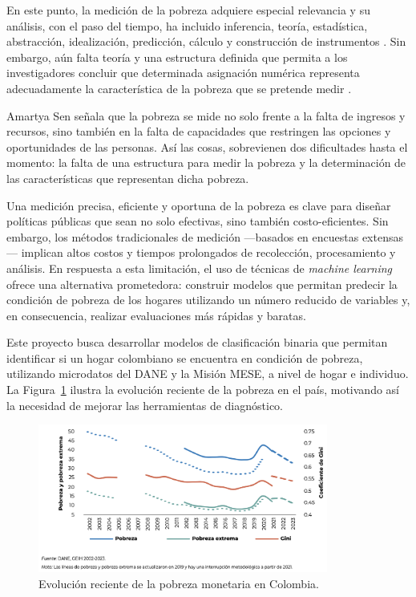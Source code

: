 \documentclass[12pt,a4paper,onecolumn]{article}
\begin{document}
En este punto, la medición de la pobreza adquiere especial relevancia y su análisis, con el paso del tiempo, ha incluido inferencia, teoría, estadística, abstracción, idealización, predicción, cálculo y construcción de instrumentos \cite{tal2016measuring}. Sin embargo, aún falta teoría y una estructura definida que permita a los investigadores concluir que determinada asignación numérica representa adecuadamente la característica de la pobreza que se pretende medir \cite{huffman2024measurement}.

Amartya Sen señala que la pobreza se mide no solo frente a la falta de ingresos y recursos, sino también en la falta de capacidades que restringen las opciones y oportunidades de las personas. Así las cosas, sobrevienen dos dificultades hasta el momento: la falta de una estructura para medir la pobreza y la determinación de las características que representan dicha pobreza.

Una medición precisa, eficiente y oportuna de la pobreza es clave para diseñar políticas públicas que sean no solo efectivas, sino también costo-eficientes. Sin embargo, los métodos tradicionales de medición —basados en encuestas extensas— implican altos costos y tiempos prolongados de recolección, procesamiento y análisis. En respuesta a esta limitación, el uso de técnicas de \textit{machine learning} ofrece una alternativa prometedora: construir modelos que permitan predecir la condición de pobreza de los hogares utilizando un número reducido de variables y, en consecuencia, realizar evaluaciones más rápidas y baratas.

Este proyecto busca desarrollar modelos de clasificación binaria que permitan identificar si un hogar colombiano se encuentra en condición de pobreza, utilizando microdatos del DANE y la Misión MESE, a nivel de hogar e individuo. La Figura~\ref{fig:pobreza_colombia} ilustra la evolución reciente de la pobreza en el país, motivando así la necesidad de mejorar las herramientas de diagnóstico.

\begin{figure}[H]
  \centering
  \includegraphics[width=0.85\textwidth]{../views/figures/pobreza_colombia.png}
  \caption{Evolución reciente de la pobreza monetaria en Colombia.}
  \label{fig:pobreza_colombia}
\end{figure}
\end{document}

